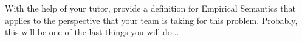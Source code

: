 With the help of your tutor, provide a definition for Empirical Semantics that applies to the perspective that your team is taking for this problem. Probably, this will be one of the last things you will do...
